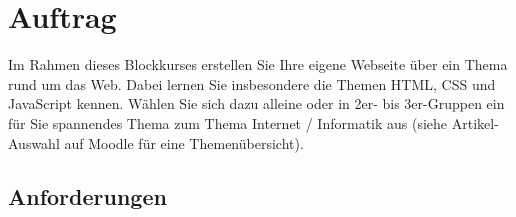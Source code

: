 

\lstset{language=HTML}
\section*{Auftrag}

Im Rahmen dieses Blockkurses erstellen Sie Ihre eigene Webseite über ein Thema rund um das Web. Dabei lernen Sie insbesondere die Themen HTML, CSS und JavaScript kennen. Wählen Sie sich dazu alleine oder in 2er- bis 3er-Gruppen ein für Sie spannendes Thema zum Thema Internet / Informatik aus (siehe Artikel-Auswahl auf Moodle für eine Themenübersicht).

\subsection*{Anforderungen}


